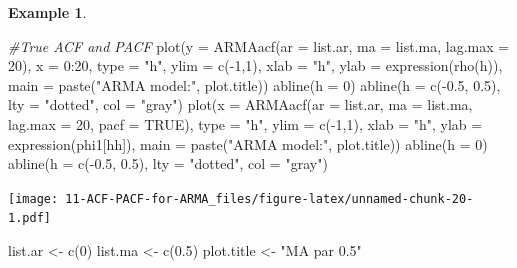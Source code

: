\documentclass[
]{book}
\newenvironment{Shaded}{\begin{snugshade}}{\end{snugshade}}
\newcommand{\AttributeTok}[1]{\textcolor[rgb]{0.77,0.63,0.00}{#1}}
\newcommand{\CommentTok}[1]{\textcolor[rgb]{0.56,0.35,0.01}{\textit{#1}}}
\newcommand{\ConstantTok}[1]{\textcolor[rgb]{0.00,0.00,0.00}{#1}}
\newcommand{\DecValTok}[1]{\textcolor[rgb]{0.00,0.00,0.81}{#1}}
\newcommand{\FloatTok}[1]{\textcolor[rgb]{0.00,0.00,0.81}{#1}}
\newcommand{\FunctionTok}[1]{\textcolor[rgb]{0.00,0.00,0.00}{#1}}
\newcommand{\NormalTok}[1]{#1}
\newcommand{\OtherTok}[1]{\textcolor[rgb]{0.56,0.35,0.01}{#1}}
\newcommand{\SpecialCharTok}[1]{\textcolor[rgb]{0.00,0.00,0.00}{#1}}
\newcommand{\StringTok}[1]{\textcolor[rgb]{0.31,0.60,0.02}{#1}}
\theoremstyle{definition}
\theoremstyle{definition}
\newtheorem{example}{Example}[chapter]
\theoremstyle{definition}
\theoremstyle{definition}
\theoremstyle{remark}
\begin{document}
\begin{example}
\begin{Shaded}
\begin{Highlighting}[]
  
  \CommentTok{\#True ACF and PACF}
  \FunctionTok{plot}\NormalTok{(}\AttributeTok{y =} \FunctionTok{ARMAacf}\NormalTok{(}\AttributeTok{ar =}\NormalTok{ list.ar, }\AttributeTok{ma =}\NormalTok{ list.ma, }\AttributeTok{lag.max =} \DecValTok{20}\NormalTok{), }\AttributeTok{x =} \DecValTok{0}\SpecialCharTok{:}\DecValTok{20}\NormalTok{, }\AttributeTok{type =} \StringTok{"h"}\NormalTok{, }\AttributeTok{ylim =} \FunctionTok{c}\NormalTok{(}\SpecialCharTok{{-}}\DecValTok{1}\NormalTok{,}\DecValTok{1}\NormalTok{), }\AttributeTok{xlab =} \StringTok{"h"}\NormalTok{, }\AttributeTok{ylab =} \FunctionTok{expression}\NormalTok{(}\FunctionTok{rho}\NormalTok{(h)),}
    \AttributeTok{main =} \FunctionTok{paste}\NormalTok{(}\StringTok{"ARMA model:"}\NormalTok{, plot.title))}
  \FunctionTok{abline}\NormalTok{(}\AttributeTok{h =} \DecValTok{0}\NormalTok{)}
  \FunctionTok{abline}\NormalTok{(}\AttributeTok{h =} \FunctionTok{c}\NormalTok{(}\SpecialCharTok{{-}}\FloatTok{0.5}\NormalTok{, }\FloatTok{0.5}\NormalTok{), }\AttributeTok{lty =} \StringTok{"dotted"}\NormalTok{, }\AttributeTok{col =} \StringTok{"gray"}\NormalTok{)}
  \FunctionTok{plot}\NormalTok{(}\AttributeTok{x =} \FunctionTok{ARMAacf}\NormalTok{(}\AttributeTok{ar =}\NormalTok{ list.ar, }\AttributeTok{ma =}\NormalTok{ list.ma, }\AttributeTok{lag.max =} \DecValTok{20}\NormalTok{, }\AttributeTok{pacf =} \ConstantTok{TRUE}\NormalTok{), }\AttributeTok{type =} \StringTok{"h"}\NormalTok{, }\AttributeTok{ylim =} \FunctionTok{c}\NormalTok{(}\SpecialCharTok{{-}}\DecValTok{1}\NormalTok{,}\DecValTok{1}\NormalTok{), }\AttributeTok{xlab =} \StringTok{"h"}\NormalTok{, }\AttributeTok{ylab =} \FunctionTok{expression}\NormalTok{(phi1[hh]),}
    \AttributeTok{main =} \FunctionTok{paste}\NormalTok{(}\StringTok{"ARMA model:"}\NormalTok{, plot.title))}
  \FunctionTok{abline}\NormalTok{(}\AttributeTok{h =} \DecValTok{0}\NormalTok{)}
  \FunctionTok{abline}\NormalTok{(}\AttributeTok{h =} \FunctionTok{c}\NormalTok{(}\SpecialCharTok{{-}}\FloatTok{0.5}\NormalTok{, }\FloatTok{0.5}\NormalTok{), }\AttributeTok{lty =} \StringTok{"dotted"}\NormalTok{, }\AttributeTok{col =} \StringTok{"gray"}\NormalTok{)}
\end{Highlighting}
\end{Shaded}

\texttt{[image: 11-ACF-PACF-for-ARMA\_files/figure-latex/unnamed-chunk-20-1.pdf]}

\begin{Shaded}
\begin{Highlighting}[]
\NormalTok{list.ar }\OtherTok{\textless{}{-}} \FunctionTok{c}\NormalTok{(}\DecValTok{0}\NormalTok{)  }
\NormalTok{list.ma }\OtherTok{\textless{}{-}} \FunctionTok{c}\NormalTok{(}\FloatTok{0.5}\NormalTok{)}
\NormalTok{plot.title }\OtherTok{\textless{}{-}} \StringTok{"MA par 0.5"}
\end{Highlighting}
\end{Shaded}


\end{example}
\end{document}
